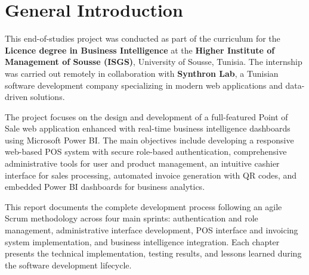 \chapter*{General Introduction}

This end-of-studies project was conducted as part of the curriculum for the \textbf{Licence degree in Business Intelligence} at the \textbf{Higher Institute of Management of Sousse (ISGS)}, University of Sousse, Tunisia. The internship was carried out remotely in collaboration with \textbf{Synthron Lab}, a Tunisian software development company specializing in modern web applications and data-driven solutions.

The project focuses on the design and development of a full-featured Point of Sale web application enhanced with real-time business intelligence dashboards using Microsoft Power BI. The main objectives include developing a responsive web-based POS system with secure role-based authentication, comprehensive administrative tools for user and product management, an intuitive cashier interface for sales processing, automated invoice generation with QR codes, and embedded Power BI dashboards for business analytics.

This report documents the complete development process following an agile Scrum methodology across four main sprints: authentication and role management, administrative interface development, POS interface and invoicing system implementation, and business intelligence integration. Each chapter presents the technical implementation, testing results, and lessons learned during the software development lifecycle. 